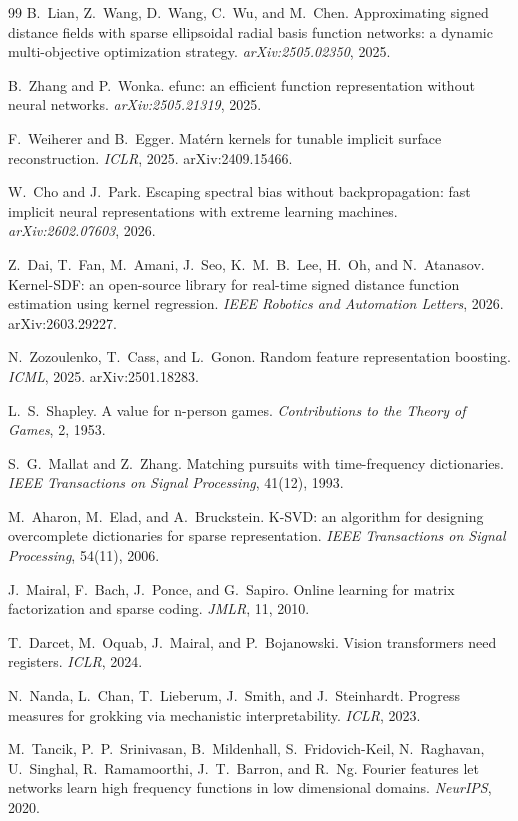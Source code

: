 \documentclass[11pt]{article}
\begin{document}
\begin{thebibliography}{99}
B.~Lian, Z.~Wang, D.~Wang, C.~Wu, and M.~Chen.
Approximating signed distance fields with sparse ellipsoidal
radial basis function networks: a dynamic multi-objective
optimization strategy.
\emph{arXiv:2505.02350}, 2025.

B.~Zhang and P.~Wonka.
efunc: an efficient function representation without neural
networks.
\emph{arXiv:2505.21319}, 2025.

F.~Weiherer and B.~Egger.
Mat\'ern kernels for tunable implicit surface reconstruction.
\emph{ICLR}, 2025. arXiv:2409.15466.

W.~Cho and J.~Park.
Escaping spectral bias without backpropagation: fast implicit neural
representations with extreme learning machines.
\emph{arXiv:2602.07603}, 2026.

Z.~Dai, T.~Fan, M.~Amani, J.~Seo, K.~M.~B.~Lee, H.~Oh, and
N.~Atanasov.
Kernel-SDF: an open-source library for real-time signed distance
function estimation using kernel regression.
\emph{IEEE Robotics and Automation Letters}, 2026. arXiv:2603.29227.

N.~Zozoulenko, T.~Cass, and L.~Gonon.
Random feature representation boosting.
\emph{ICML}, 2025. arXiv:2501.18283.

L.~S.~Shapley.
A value for n-person games.
\emph{Contributions to the Theory of Games}, 2, 1953.

S.~G.~Mallat and Z.~Zhang.
Matching pursuits with time-frequency dictionaries.
\emph{IEEE Transactions on Signal Processing}, 41(12), 1993.

M.~Aharon, M.~Elad, and A.~Bruckstein.
K-SVD: an algorithm for designing overcomplete dictionaries for
sparse representation.
\emph{IEEE Transactions on Signal Processing}, 54(11), 2006.

J.~Mairal, F.~Bach, J.~Ponce, and G.~Sapiro.
Online learning for matrix factorization and sparse coding.
\emph{JMLR}, 11, 2010.

T.~Darcet, M.~Oquab, J.~Mairal, and P.~Bojanowski.
Vision transformers need registers.
\emph{ICLR}, 2024.

N.~Nanda, L.~Chan, T.~Lieberum, J.~Smith, and J.~Steinhardt.
Progress measures for grokking via mechanistic interpretability.
\emph{ICLR}, 2023.

M.~Tancik, P.~P.~Srinivasan, B.~Mildenhall, S.~Fridovich-Keil,
N.~Raghavan, U.~Singhal, R.~Ramamoorthi, J.~T.~Barron, and R.~Ng.
Fourier features let networks learn high frequency functions in low
dimensional domains.
\emph{NeurIPS}, 2020.


\end{thebibliography}
\end{document}
